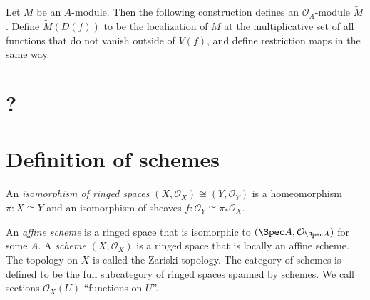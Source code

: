 \begin{definition}\label{dfn:4-1-3}
	Let $M$ be an $A$-module. Then the following construction defines an $\mathcal{O}_A$-module $\widetilde{M}$. Define $\widetilde{M} (D(f))$ to be the localization of $M$ at the multiplicative set of all functions that do not vanish outside of $V(f)$, and define restriction maps in the same way.
\end{definition}


\section{?}

\section{Definition of schemes}

\begin{definition}\label{dfn:4-3-1}
	An \emph{isomorphism of ringed spaces} $(X,\mathcal{O} _X) \cong (Y,\mathcal{O} _Y)$ is a homeomorphism $\pi : X \cong Y$ and an isomorphism of sheaves $f : \mathcal{O}_Y \cong \pi _* \mathcal{O} _X$.
\end{definition}
\begin{definition}\label{dfn:4-3-2}
	An \emph{affine scheme} is a ringed space that is isomorphic to $(\Spec A, \mathcal{O} _{\Spec A} )$ for some $A$. A \emph{scheme} $(X,\mathcal{O}_X)$ is a ringed space that is locally an affine scheme. The topology on $X$ is called the Zariski topology. The category of schemes is defined to be the full subcategory of ringed spaces spanned by schemes. We call sections $\mathcal{O}_X(U)$ ``functions on $U$''.
\end{definition}

